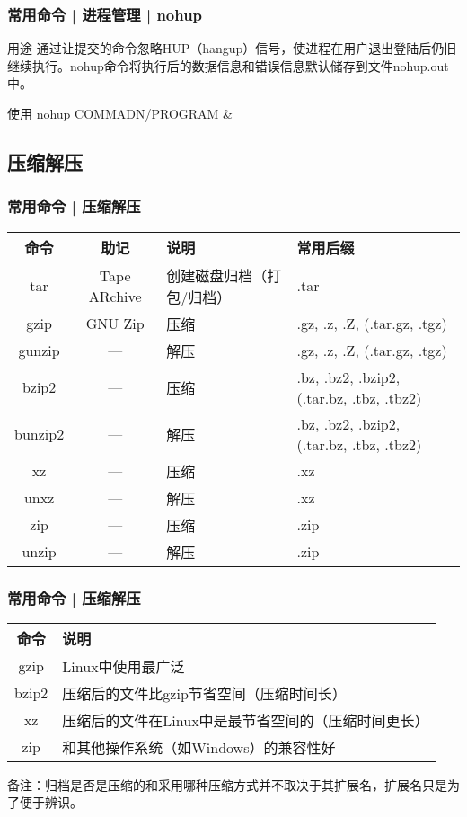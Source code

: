 \begin{frame}
  \frametitle{常用命令 | 进程管理 | \alert{nohup}}
  \begin{block}{用途}
    通过让提交的命令忽略HUP（hangup）信号，使进程在用户退出登陆后仍旧继续执行。nohup命令将执行后的数据信息和错误信息默认储存到文件nohup.out中。
  \end{block}
  \pause
  \begin{block}{使用}
    nohup COMMADN/PROGRAM \&
  \end{block}
\end{frame}

\subsection{压缩解压}
\begin{frame}
  \frametitle{常用命令 | \alert{压缩解压}}
  \begin{table}
    \centering
    \begin{tabularx}{\textwidth}{ccXX}
      \hline
      \rowcolor{blue!50}命令 & 助记 & 说明 & 常用后缀\\
      \hline
      tar & Tape ARchive & 创建磁盘归档（打包/归档） & .tar\\
      gzip & GNU Zip & 压缩 & .gz, .z, .Z, (.tar.gz, .tgz)\\
      gunzip & --- & 解压 & .gz, .z, .Z, (.tar.gz, .tgz)\\
      bzip2 & --- & 压缩 & .bz, .bz2, .bzip2, (.tar.bz, .tbz, .tbz2)\\
      bunzip2 & --- & 解压 & .bz, .bz2, .bzip2, (.tar.bz, .tbz, .tbz2)\\
      xz & --- & 压缩 & .xz\\
      unxz & --- & 解压 & .xz\\
      zip & --- & 压缩 & .zip\\
      unzip & --- & 解压 & .zip\\
      \hline
    \end{tabularx}
  \end{table}
\end{frame}

\begin{frame}
  \frametitle{常用命令 | \alert{压缩解压}}
  \begin{table}
    \centering
    \begin{tabularx}{\textwidth}{cX}
      \hline
      \rowcolor{blue!50}命令 & 说明\\
      \hline
      gzip & Linux中使用最广泛\\
      bzip2 & 压缩后的文件比gzip节省空间（压缩时间长）\\
      xz & 压缩后的文件在Linux中是最节省空间的（压缩时间更长）\\
      zip & 和其他操作系统（如Windows）的兼容性好\\
      \hline
    \end{tabularx}
  \end{table}
  备注：归档是否是压缩的和采用哪种压缩方式并不取决于其扩展名，扩展名只是为了便于辨识。
\end{frame}


